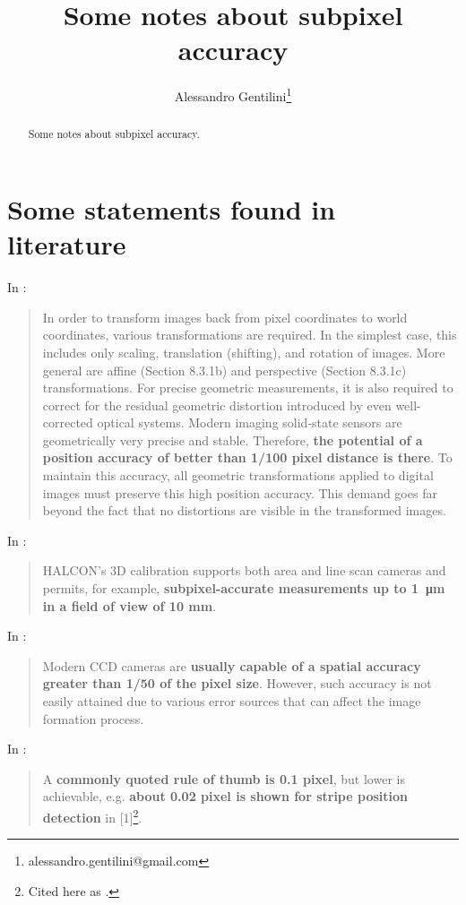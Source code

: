\documentclass[a4paper,12pt]{article}
\title{Some notes about subpixel accuracy}
\author{Alessandro Gentilini\thanks{alessandro.gentilini@gmail.com}}
\begin{document}
\maketitle

\begin{abstract}
Some notes about subpixel accuracy.
\end{abstract} 

\section{Some statements found in literature}
In \cite[section 8.2, p.270]{Jahne:2004:PHI:983100}:
\begin{quotation}
In order to transform images back from pixel coordinates to world coordinates,
various transformations are required. In the simplest case, this
includes only scaling,
translation (shifting), and rotation of images. More general are
affine (Section 8.3.1b)
and perspective (Section 8.3.1c) transformations. For precise
geometric measurements,
it is also required to correct for the residual geometric distortion
introduced by even
well-corrected optical systems. Modern imaging solid-state sensors are
geometrically
very precise and stable. Therefore, \textbf{the potential of a position
accuracy of better than
1/100 pixel distance is there}. To maintain this accuracy, all
geometric transformations
applied to digital images must preserve this high position accuracy.
This demand goes
far beyond the fact that no distortions are visible in the transformed images.
\end{quotation}

In \cite{halcon}:
\begin{quotation}
HALCON’s 3D calibration supports both area and line scan cameras and
permits, for example, \textbf{subpixel-accurate measurements up to \SI{1}{\micro\metre} in a field of
view of 10 mm}.
\end{quotation}

In \cite{Heikkila:2000:GCC:354167.354171}:
\begin{quotation}
Modern CCD cameras are \textbf{usually capable of a spatial accuracy greater than 1/50 of the pixel
size}. However, such accuracy is not easily attained due to various error sources that can affect
the image formation process.
\end{quotation}

In \cite{Fisher}:
\begin{quotation}
A \textbf{commonly quoted rule of thumb is 0.1 pixel}, but lower is achievable, e.g. \textbf{about 0.02 pixel is shown for stripe position detection} in [1]\footnote{Cited here as \cite{doi:10.1117/12.55947}.}.
\end{quotation}
\end{document}
